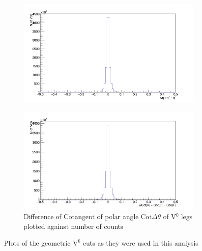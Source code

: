 \begin{figure}
\begin{subfigure}[h]{.4\linewidth}
\includegraphics[width=1.0\linewidth]{Figures/additionalV0cuts/DeltaEta.png}
\caption{}
\label{fig:DEta}
\end{subfigure}\hspace{1cm}%
\begin{subfigure}[h]{.4\linewidth}
\includegraphics[width=1.0\linewidth]{Figures/additionalV0cuts/DeltaCotTheta.png}
\caption{Difference of Cotangent of polar angle $\mathrm{Cot}\Delta\theta$ of V$^0$ legs plotted against number of counts}
\label{fig:DCotTheta}
\end{subfigure}
\vspace{0.5cm}
\caption{Plots of the geometric V$^0$ cuts as they were used in this analysis}
\label{fig:V0cuts}
\end{figure}

